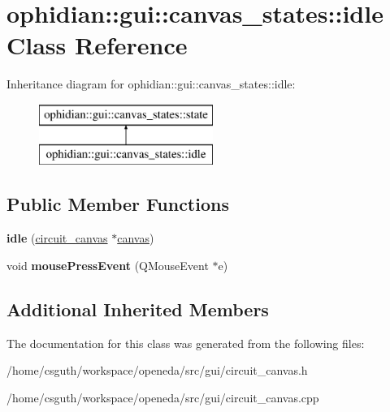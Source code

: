 \hypertarget{classophidian_1_1gui_1_1canvas__states_1_1idle}{\section{ophidian\-:\-:gui\-:\-:canvas\-\_\-states\-:\-:idle Class Reference}
\label{classophidian_1_1gui_1_1canvas__states_1_1idle}
}
Inheritance diagram for ophidian\-:\-:gui\-:\-:canvas\-\_\-states\-:\-:idle\-:\begin{figure}[H]
\begin{center}
\leavevmode
\includegraphics[height=2.000000cm]{classophidian_1_1gui_1_1canvas__states_1_1idle}
\end{center}
\end{figure}
\subsection*{Public Member Functions}
\begin{DoxyCompactItemize}
\item 
\hypertarget{classophidian_1_1gui_1_1canvas__states_1_1idle_a3451168c370c94c1b232f0f96259e1be}{{\bfseries idle} (\hyperlink{classophidian_1_1gui_1_1circuit__canvas}{circuit\-\_\-canvas} $\ast$\hyperlink{classophidian_1_1gui_1_1canvas}{canvas})}\label{classophidian_1_1gui_1_1canvas__states_1_1idle_a3451168c370c94c1b232f0f96259e1be}

\item 
\hypertarget{classophidian_1_1gui_1_1canvas__states_1_1idle_a4f66556d85da4064109b7e3855484cb9}{void {\bfseries mouse\-Press\-Event} (Q\-Mouse\-Event $\ast$e)}\label{classophidian_1_1gui_1_1canvas__states_1_1idle_a4f66556d85da4064109b7e3855484cb9}

\end{DoxyCompactItemize}
\subsection*{Additional Inherited Members}


The documentation for this class was generated from the following files\-:\begin{DoxyCompactItemize}
\item 
/home/csguth/workspace/openeda/src/gui/circuit\-\_\-canvas.\-h\item 
/home/csguth/workspace/openeda/src/gui/circuit\-\_\-canvas.\-cpp\end{DoxyCompactItemize}
